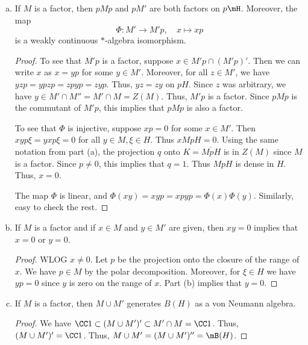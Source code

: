 \documentclass{article}
\begin{document}
\begin{enumerate}[(a)]
\begin{proof}
  The last inclusion to prove is that $pM' \subset (pMp)'$.  But we already know that $pM' \subset (pM')'' = (pMp)'$ from the first part of the problem.
  \end{proof}

\item If $M$ is a factor, then $pMp$ and $pM'$ are both factors on $p\mH$. Moreover, the map
  $$\Phi : M' \to M' p, \quad x \mapsto xp$$
  is a weakly continuous $*$-algebra isomorphism.

  \begin{proof}
    To see that $M'p$ is a factor, suppose $x \in M'p \cap (M'p)'$.  Then we can write $x$ as $x = yp$ for some $y \in M'$.
    Moreover, for all $z \in M'$, we have $yzp = ypzp = zpyp = zyp$.  Thus, $yz = zy$ on $pH$. Since $z$ was arbitrary,
    we have $y \in M' \cap M'' = M' \cap M = Z(M)$.  Thus, $M'p$ is a factor.  Since $pMp$ is the commutant of $M'p$,
    this implies that $pMp$ is also a factor.

    To see that $\Phi$ is injective, suppose $xp = 0$ for some $x \in M'$.   Then $x y p \xi = yx p \xi = 0$ for all $y \in M, \xi \in H$.
    Thus $x MpH = 0$.  Using the same notation from part (a), the projection $q$ onto $K = \overline{MpH}$ is in $Z(M)$ since $M$ is a factor.  Since
    $p \neq 0$, this implies that $q = 1$.  Thus $MpH$ is dense in $H$.  Thus, $x = 0$.

    The map $\Phi$ is linear, and $\Phi(xy) = xyp = xpyp = \Phi(x) \Phi(y)$. Similarly, easy to check the rest.
  \end{proof}
  
\item If $M$ is a factor and if $x \in M$ and $y \in M'$ are given, then $xy = 0$ implies that $x = 0$ or $y = 0$.
  \begin{proof}
    WLOG $x \neq 0$. Let $p$ be the projection onto the closure of the range of $x$. We have $p \in M$ by the polar decomposition. Moreover,
    for $\xi \in H$ we have $yp = 0$ since $y$ is zero on the range of $x$. Part (b) implies that $y = 0$.
  \end{proof}

\item If $M$ is a factor, then $M \cup M'$ generates $B(H)$ as a von Neumann algebra.
  \begin{proof}
    We have $\CC 1 \subset (M \cup M')' \subset M' \cap M = \CC 1$.  Thus, $(M \cup M')' = \CC 1$.
    Thus, $M \cup M'  = (M \cup M')''= \mB(H)$.
  \end{proof}


\end{enumerate}
\end{document}
